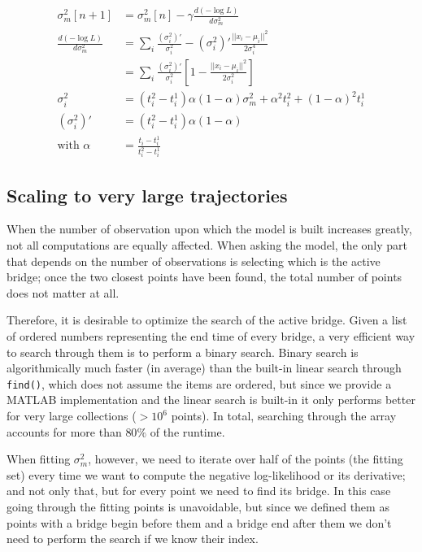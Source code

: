 \documentclass[12pt]{article}
\begin{document}
\begin{align*}
    \sigma_m^2[n+1] &= \sigma_m^2[n] - \gamma \frac{d(-\log L)}{d\sigma_m^2} \\
    \frac{d(-\log L)}{d\sigma_m^2} &= \sum_i \frac{(\sigma_i^2)'}{\sigma_i^2} - (\sigma_i^2)'\frac{||x_i - \mu_i||^2}{2\sigma_i^4} \\
    &= \sum_i \frac{(\sigma_i^2)'}{\sigma_i^2} \left[ 1 -  \frac{||x_i - \mu_i||^2}{2\sigma_i^2} \right]\\
    \sigma_i^2 &= (t_i^2-t_i^1)\alpha(1-\alpha)\sigma_m^2 + \alpha^2t_i^2 + (1-\alpha)^2t_i^1 \\
    (\sigma_i^2)' &= (t_i^2-t_i^1)\alpha(1-\alpha) \\
    \text{with } \alpha &= \frac{t_i - t_i^1}{t_i^2 - t_i^1}
\end{align*}


\subsection{Scaling to very large trajectories}

When the number of observation upon which the model is built increases greatly, not all computations are equally affected. When asking the model, the only part that depends on the number of observations is selecting which is the active bridge; once the two closest points have been found, the total number of points does not matter at all.

Therefore, it is desirable to optimize the search of the active bridge. Given a list of ordered numbers representing the end time of every bridge, a very efficient way to search through them is to perform a binary search. Binary search is algorithmically much faster (in average) than the built-in linear search through \texttt{find()}, which does not assume the items are ordered, but since we provide a MATLAB implementation and the linear search is built-in it only performs better for very large collections ($>10^6$ points). In total, searching through the array accounts for more than $80\%$ of the runtime.

When fitting $\sigma_m^2$, however, we need to iterate over half of the points (the fitting set) every time we want to compute the negative log-likelihood or its derivative; and not only that, but for every point we need to find its bridge. In this case going through the fitting points is unavoidable, but since we defined them as points with a bridge begin before them and a bridge end after them we don't need to perform the search if we know their index.
\end{document}
